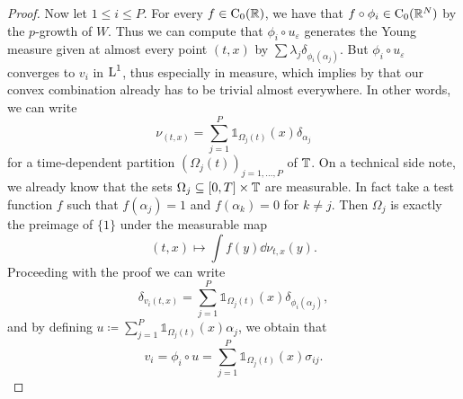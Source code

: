 \begin{proof}
 	Now let $ 1 \leq i \leq P $. For every $ f \in \operatorname{C}_{ 0 } ( \mathbb{ R } ) 
 	$, we have that $ f \circ \phi_{ i } \in \operatorname{C}_{ 0 } ( \mathbb{ R }^{ N } ) 
 	$ by the $p$-growth of $ W $. Thus we can compute that $ \phi_{ i } \circ 
 	u_{ \varepsilon } $ generates the Young measure given at almost every point 
 	$ ( t, x ) $ by $ \sum \lambda_{ j } \delta_{ \phi_{ i 
 	} ( \alpha_{ j } ) } $.
 	But $ \phi_{ i } \circ u_{ \varepsilon } $ converges to $ v_{ i } $ in $ 
 	\operatorname{L}^{ 1 } $, thus especially in measure, which implies by 
 	\cite[Cor.~3.2]{Müller1999} that our convex combination already has to be 
 	trivial almost everywhere. In other words, we can write 
 	\begin{equation*}
 		\nu_{ ( t , x ) }
 		=
 		\sum_{ j= 1 }^{ P }
 			\mathds{ 1 }_{ \Omega_{ j } ( t ) } ( x )
 			\delta_{ \alpha_{ j } }
 	\end{equation*}
 	for a time-dependent partition $ ( \Omega_{ j } ( t ) )_{ j = 1 , \dotsc , 
 	P } $ of $ \operatorname{\mathbb{T}} $. On a technical side note, we already know that the 
 	sets $ \Omega_{ j } \subseteq [ 0 , T ] \times \operatorname{\mathbb{T}} $ are measurable.
 	In fact take a test function $ f $ such that $ f ( \alpha_{ j } ) = 1 $ and 
 	$ f ( 
 	\alpha_{ k } ) = 0 $ for $ k \neq j $. Then $ \Omega_{ j } $ is exactly the 
 	preimage of $ \{ 1 \} $ under the measurable map 
 	\begin{equation*}
 		( t , x ) \mapsto \int f ( y ) \dd{ \nu_{ t , x } ( y ) }.
 	\end{equation*} 
 	Proceeding with the proof we can write 
 	\begin{equation*}
 		\delta_{ v_{ i } ( t , x ) }
 		=
 		\sum_{ j = 1 }^{ P }
 			\mathds{ 1 }_{ \Omega_{ j } ( t ) } ( x )
 			\delta_{ \phi_{ i } ( \alpha_{ j } ) },
 	\end{equation*}
 	and by defining 
 	$ u \coloneqq \sum_{ j = 1 }^{ P } \mathds{ 1 }_{ \Omega_{ j } ( t ) } ( x ) \alpha_{ j } $, 
 	we obtain that 
 	\begin{equation*} 
 		v_{ i } = 
 		\phi_{ i } \circ u  = \sum_{ j = 1 }^{ P } \mathds{ 1 }_{ \Omega_{ j } 
 		( t ) } ( x ) \sigma_{ i j } .
 	\end{equation*}
 

\end{proof}
